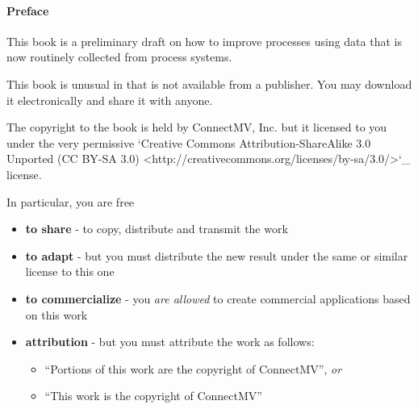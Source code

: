 \paragraph{Preface}





This book is a preliminary draft on how to improve processes using data that is now routinely collected from process systems.

This book is unusual in that is not available from a publisher. You may download it electronically and share it with anyone.

The copyright to the book is held by ConnectMV, Inc. but it licensed to you under the very permissive `Creative Commons Attribution-ShareAlike 3.0 Unported (CC BY-SA 3.0) <http://creativecommons.org/licenses/by-sa/3.0/>`_ license.

In particular, you are free 
\begin{itemize}
	\item	\textbf{to share} - to copy, distribute and transmit the work
	\item	\textbf{to adapt} - but you must distribute the new result under the same or similar license to this one
	\item	\textbf{to commercialize} - you \emph{are allowed} to create commercial applications based on this work 
	\item	\textbf{attribution} - but you must attribute the work as follows:
	\begin{itemize}
		\item	``Portions of this work are the copyright of ConnectMV'', \emph{or}
		\item	``This work is the copyright of ConnectMV''
	\end{itemize}
\end{itemize}

